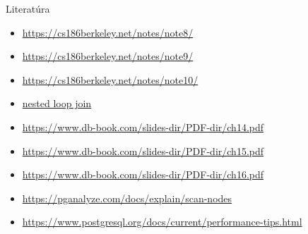 \documentclass[12pt]{beamer}
\begin{document}
\begin{frame}{Literatúra}
\begin{itemize}
\item {\scriptsize\url{https://cs186berkeley.net/notes/note8/}}
\item {\scriptsize\url{https://cs186berkeley.net/notes/note9/}}
\item {\scriptsize\url{https://cs186berkeley.net/notes/note10/}}
\item {\scriptsize\href{https://shorturl.at/bcrLU}{nested loop join}}
\item {\scriptsize\url{https://www.db-book.com/slides-dir/PDF-dir/ch14.pdf}}
\item {\scriptsize\url{https://www.db-book.com/slides-dir/PDF-dir/ch15.pdf}}
\item {\scriptsize\url{https://www.db-book.com/slides-dir/PDF-dir/ch16.pdf}}
\item {\scriptsize\url{https://pganalyze.com/docs/explain/scan-nodes}}
\item {\scriptsize\url{https://www.postgresql.org/docs/current/performance-tips.html}}
\end{itemize}
\end{frame}
\end{document}
